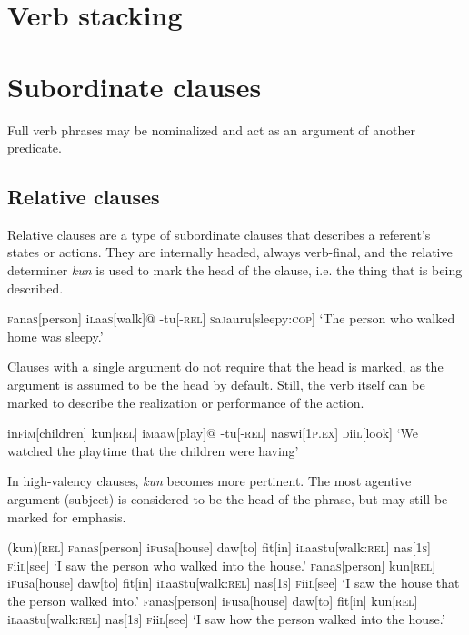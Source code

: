 \documentclass[a4paper,10pt,twoside,openright]{memoir}
\newcommand{\famword}[5]{#1\textsc{#2}#3\textsc{#4}#5}
\begin{document}
\section{Verb stacking}

\section{Subordinate clauses}

Full verb phrases may be nominalized and act as an argument of another predicate.

\subsection{Relative clauses}

Relative clauses are a type of subordinate clauses that describes a referent's states or actions. They are internally headed, always verb-final, and the relative determiner \emph{kun} is used to mark the head of the clause, i.e. the thing that is being described.

\ex
\begingl
\famword{}{f}{ana}{s}{}[person]
\famword{i}{l}{aa}{s}{}[walk]@
-tu[\textsc{-rel}]
\famword{}{s}{a}{j}{a}uru[sleepy:\textsc{cop}]
\glft `The person who walked home was sleepy.'
\endgl
\xe

Clauses with a single argument do not require that the head is marked, as the argument is assumed to be the head by default. Still, the verb itself can be marked to describe the realization or performance of the action.

\ex
\begingl
\famword{in}{f}{i}{m}{}[children]
kun[\textsc{rel}]
\famword{i}{m}{aa}{w}{}[play]@
-tu[\textsc{-rel}]
naswi[\textsc{1p.ex}]
\famword{}{d}{ii}{l}{}[look]
\glft `We watched the playtime that the children were having'
\endgl
\xe

In high-valency clauses, \emph{kun} becomes more pertinent. The most agentive argument (subject) is considered to be the head of the phrase, but may still be marked for emphasis.

\pex[interpartskip=3ex]
\a
\begingl
(kun)[\textsc{rel}]
\famword{}{f}{ana}{s}{}[person]
\famword{i}{f}{u}{s}{a}[house]
daw[to]
fit[in]
\famword{i}{l}{aa}{s}{}tu[walk\textsc{:rel}]
nas[\textsc{1s}]
\famword{}{f}{ii}{l}{}[see]
\glft `I saw the person who walked into the house.'
\endgl
\a
\begingl
\famword{}{f}{ana}{s}{}[person]
kun[\textsc{rel}]
\famword{i}{f}{u}{s}{a}[house]
daw[to]
fit[in]
\famword{i}{l}{aa}{s}{}tu[walk\textsc{:rel}]
nas[\textsc{1s}]
\famword{}{f}{ii}{l}{}[see]
\glft `I saw the house that the person walked into.'
\endgl
\a
\begingl
\famword{}{f}{ana}{s}{}[person]
\famword{i}{f}{u}{s}{a}[house]
daw[to]
fit[in]
kun[\textsc{rel}]
\famword{i}{l}{aa}{s}{}tu[walk\textsc{:rel}]
nas[\textsc{1s}]
\famword{}{f}{ii}{l}{}[see]
\glft `I saw how the person walked into the house.'
\endgl
\xe
\end{document}

